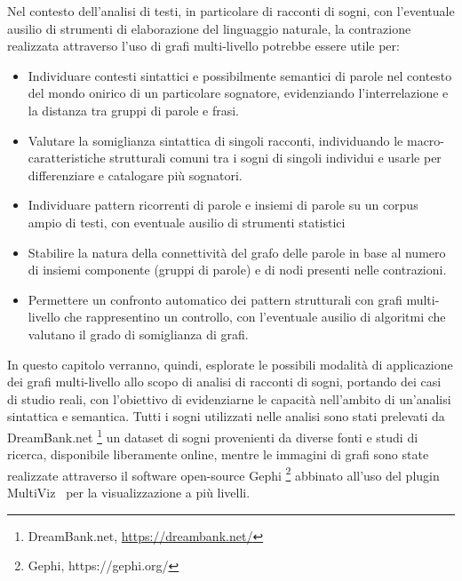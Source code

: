 Nel contesto dell'analisi di testi, in particolare di racconti di sogni, con l'eventuale ausilio di strumenti di
elaborazione del linguaggio naturale, la contrazione realizzata attraverso l'uso di grafi multi-livello potrebbe
essere utile per:
\begin{itemize}
    \item Individuare contesti sintattici e possibilmente semantici di parole nel contesto del mondo onirico
    di un particolare sognatore, evidenziando l'interrelazione e la distanza tra gruppi di parole e frasi.
    \item Valutare la somiglianza sintattica di singoli racconti, individuando le macro-caratteristiche
    strutturali comuni tra i sogni di singoli individui e usarle per differenziare e catalogare più sognatori.
    \item Individuare pattern ricorrenti di parole e insiemi di parole su un corpus ampio di testi, con
    eventuale ausilio di strumenti statistici
    \item Stabilire la natura della connettività del grafo delle parole in base al numero di insiemi componente
    (gruppi di parole) e di nodi presenti nelle contrazioni.
    \item Permettere un confronto automatico dei pattern strutturali con grafi multi-livello che rappresentino
    un controllo, con l'eventuale ausilio di algoritmi che valutano il grado di somiglianza di grafi.
\end{itemize}

In questo capitolo verranno, quindi, esplorate le possibili modalità di applicazione dei grafi multi-livello allo scopo
di analisi di racconti di sogni, portando dei casi di studio reali, con l'obiettivo di evidenziarne le capacità
nell'ambito di un'analisi sintattica e semantica.
Tutti i sogni utilizzati nelle analisi sono stati prelevati da DreamBank.net \footnote{DreamBank.net, \url{https://dreambank.net/}}
un dataset di sogni provenienti da diverse fonti e studi di ricerca, disponibile liberamente online, mentre le
immagini di grafi sono state realizzate attraverso il software open-source Gephi \footnote{Gephi, https://gephi.org/}
abbinato all'uso del plugin MultiViz~\cite{s2022multivizgephipluginscalable} per la visualizzazione a più livelli.



